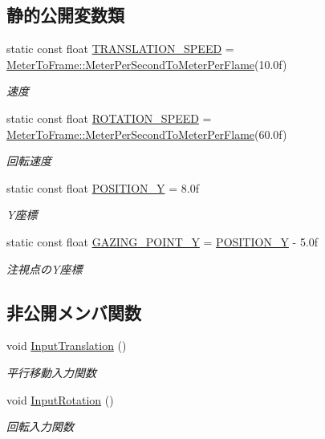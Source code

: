 \subsection*{静的公開変数類}
\begin{DoxyCompactItemize}
\item 
static const float \mbox{\hyperlink{class_camera_state___normal_acd086e43e51154cb0bff449ea39db79c}{T\+R\+A\+N\+S\+L\+A\+T\+I\+O\+N\+\_\+\+S\+P\+E\+ED}} = \mbox{\hyperlink{class_meter_to_frame_aa5468938f59eb934bfc6a897a7513812}{Meter\+To\+Frame\+::\+Meter\+Per\+Second\+To\+Meter\+Per\+Flame}}(10.\+0f)
\begin{DoxyCompactList}\small\item\em 速度 \end{DoxyCompactList}\item 
static const float \mbox{\hyperlink{class_camera_state___normal_a793965d8e28c23dc9393f2f2657ebaee}{R\+O\+T\+A\+T\+I\+O\+N\+\_\+\+S\+P\+E\+ED}} = \mbox{\hyperlink{class_meter_to_frame_aa5468938f59eb934bfc6a897a7513812}{Meter\+To\+Frame\+::\+Meter\+Per\+Second\+To\+Meter\+Per\+Flame}}(60.\+0f)
\begin{DoxyCompactList}\small\item\em 回転速度 \end{DoxyCompactList}\item 
static const float \mbox{\hyperlink{class_camera_state___normal_a1cc19e3c91f60ff2d61ba13dff3fa038}{P\+O\+S\+I\+T\+I\+O\+N\+\_\+Y}} = 8.\+0f
\begin{DoxyCompactList}\small\item\em Y座標 \end{DoxyCompactList}\item 
static const float \mbox{\hyperlink{class_camera_state___normal_a4a606caae109107cc222287620b7e37d}{G\+A\+Z\+I\+N\+G\+\_\+\+P\+O\+I\+N\+T\+\_\+Y}} = \mbox{\hyperlink{class_camera_state___normal_a1cc19e3c91f60ff2d61ba13dff3fa038}{P\+O\+S\+I\+T\+I\+O\+N\+\_\+Y}} -\/ 5.\+0f
\begin{DoxyCompactList}\small\item\em 注視点の\+Y座標 \end{DoxyCompactList}\end{DoxyCompactItemize}
\subsection*{非公開メンバ関数}
\begin{DoxyCompactItemize}
\item 
void \mbox{\hyperlink{class_camera_state___normal_a8989cddf35141ae6b875393755479c4c}{Input\+Translation}} ()
\begin{DoxyCompactList}\small\item\em 平行移動入力関数 \end{DoxyCompactList}\item 
void \mbox{\hyperlink{class_camera_state___normal_acaaa5e148b8ce2769a54fe13892ae3bd}{Input\+Rotation}} ()
\begin{DoxyCompactList}\small\item\em 回転入力関数 \end{DoxyCompactList}\end{DoxyCompactItemize}
